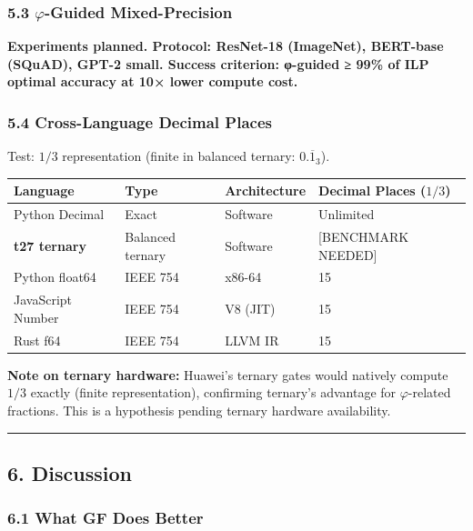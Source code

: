 \subsubsection{\texorpdfstring{5.3 \(\varphi\)-Guided
Mixed-Precision}{5.3 \textbackslash varphi-Guided Mixed-Precision}}\label{varphi-guided-mixed-precision}

\textbf{Experiments planned. Protocol: ResNet-18 (ImageNet), BERT-base
(SQuAD), GPT-2 small. Success criterion: φ-guided ≥ 99\% of ILP optimal
accuracy at 10× lower compute cost.}

\subsubsection{5.4 Cross-Language Decimal
Places}\label{cross-language-decimal-places}

Test: \(1/3\) representation (finite in balanced ternary:
\(0.\overline{1}_3\)).

{\def\LTcaptype{none} %
\begin{longtable}[]{@{}llll@{}}
\toprule\noalign{}
Language & Type & Architecture & Decimal Places (\(1/3\)) \\
\midrule\noalign{}
\endhead
\bottomrule\noalign{}
\endlastfoot
Python Decimal & Exact & Software & Unlimited \\
\textbf{t27 ternary} & Balanced ternary & Software & {[}BENCHMARK
NEEDED{]} \\
Python float64 & IEEE 754 & x86-64 & 15 \\
JavaScript Number & IEEE 754 & V8 (JIT) & 15 \\
Rust f64 & IEEE 754 & LLVM IR & 15 \\
\end{longtable}
}

\textbf{Note on ternary hardware:} Huawei's ternary gates would natively
compute \(1/3\) exactly (finite representation), confirming ternary's
advantage for \(\varphi\)-related fractions. This is a hypothesis
pending ternary hardware availability.

\begin{center}\rule{0.5\linewidth}{0.5pt}\end{center}

\subsection{6. Discussion}\label{discussion}

\subsubsection{6.1 What GF Does Better}\label{what-gf-does-better}

